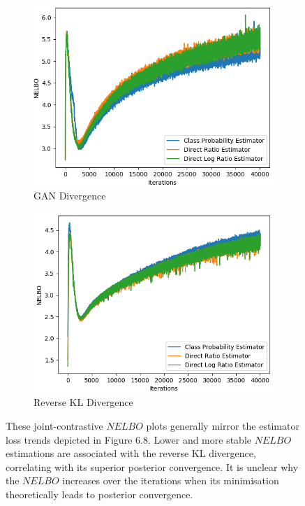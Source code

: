 \documentclass[honours,12pt]{unswthesis}
\numberwithin{equation}{section}
\theoremstyle{definition}
\begin{document}
\begin{figure}
\begin{subfigure}{0.49\textwidth}
\includegraphics[width=\linewidth]{nelbos/JCADVvsJCADVexpvsJCADVgudlog.png}
\caption{GAN Divergence}
\end{subfigure}
\begin{subfigure}{0.49\textwidth}
\includegraphics[width=\linewidth]{nelbos/JCKLDvsJCKLexpvsJCKLgudlog.png}
\caption{Reverse KL Divergence}
\end{subfigure}
\caption{\small These joint-contrastive $NELBO$ plots generally mirror the estimator loss trends depicted in Figure 6.8. Lower and more stable $NELBO$ estimations are associated with the reverse KL divergence, correlating with its superior posterior convergence. It is unclear why the $NELBO$ increases over the iterations when its minimisation theoretically leads to posterior convergence.}
\label{fig:6.6}
\end{figure}
\end{document}
